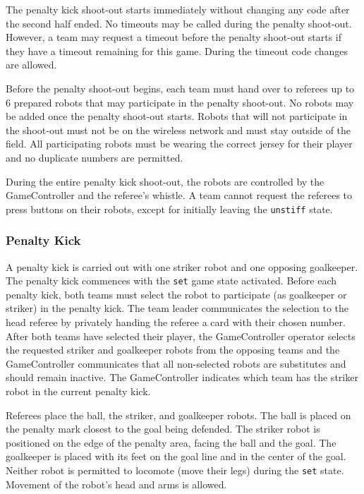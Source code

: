 The penalty kick shoot-out starts immediately without changing any code after the second half ended.
No timeouts may be called during the penalty shoot-out.
However, a team may request a timeout before the penalty shoot-out starts if they have a timeout remaining for this game.
During the timeout code changes are allowed.

Before the penalty shoot-out begins, each team must hand over to referees up to 6 prepared robots that may participate in the penalty shoot-out.
No robots may be added once the penalty shoot-out starts.
Robots that will not participate in the shoot-out must not be on the wireless network and must stay outside of the field.
All participating robots must be wearing the correct jersey for their player and no duplicate numbers are permitted.

During the entire penalty kick shoot-out, the robots are controlled by the GameController and the referee's whistle.
A team cannot request the referees to press buttons on their robots, except for initially leaving the \texttt{unstiff} state.

\subsubsection{Penalty Kick}
\label{sec:pso_kick}

A penalty kick is carried out with one striker robot and one opposing goalkeeper.
The penalty kick commences with the \texttt{set} game state activated.
Before each penalty kick, both teams must select the robot to participate (as goalkeeper or striker) in the penalty kick.
The team leader communicates the selection to the head referee by privately handing the referee a card with their chosen number.
After both teams have selected their player, the GameController operator selects the requested striker and goalkeeper robots from the opposing teams and the GameController communicates that all non-selected robots are substitutes and should remain inactive.
The GameController indicates which team has the striker robot in the current penalty kick.

Referees place the ball, the striker, and goalkeeper robots.
The ball is placed on the penalty mark closest to the goal being defended.
The striker robot is positioned on the edge of the penalty area, facing the ball and the goal.
The goalkeeper is placed with its feet on the goal line and in the center of the goal.
Neither robot is permitted to locomote (move their legs) during the \texttt{set} state.
Movement of the robot's head and arms is allowed.

